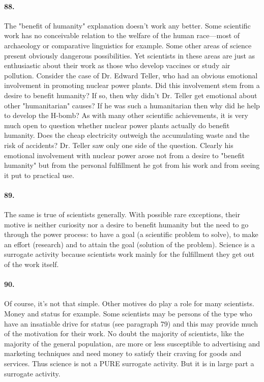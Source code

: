 \documentclass[12pt]{book}
\begin{document}
\paragraph{88.}  The "benefit of humanity" explanation doesn't work any better.  Some scientific work has no conceivable relation to the welfare of the human race---most of archaeology or comparative linguistics for example.  Some other areas of science present obviously dangerous possibilities. Yet scientists in these areas are just as enthusiastic about their work as those who develop vaccines or study air pollution. Consider the case of Dr.  Edward Teller, who had an obvious emotional involvement in promoting nuclear power plants. Did this involvement stem from a desire to benefit humanity? If so, then why didn't Dr. Teller get emotional about other "humanitarian" causes? If he was such a humanitarian then why did he help to develop the H-bomb? As with many other scientific achievements, it is very much open to question whether nuclear power plants actually do benefit humanity. Does the cheap electricity outweigh the accumulating waste and the risk of accidents? Dr. Teller saw only one side of the question. Clearly his emotional involvement with nuclear power arose not from a desire to "benefit humanity" but from the personal fulfillment he got from his work and from seeing it put to practical use.


\paragraph{89.} The same is true of scientists generally. With possible rare exceptions, their motive is neither curiosity nor a desire to benefit humanity but the need to go through the power process: to have a goal (a scientific problem to solve), to make an effort (research) and to attain the goal (solution of the problem). Science is a surrogate activity because scientists work mainly for the fulfillment they get out of the work itself.


\paragraph{90.} Of course, it's not that simple. Other motives do play a role for many scientists. Money and status for example. Some scientists may be persons of the type who have an insatiable drive for status (see paragraph 79) and this may provide much of the motivation for their work. No doubt the majority of scientists, like the majority of the general population, are more or less susceptible to advertising and marketing techniques and need money to satisfy their craving for goods and services. Thus science is not a PURE surrogate activity. But it is in large part a surrogate activity.
\end{document}
